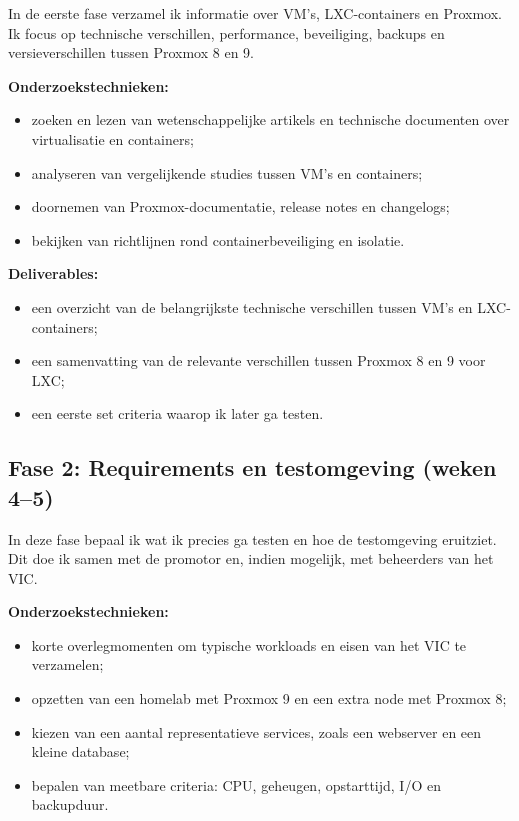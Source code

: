 In de eerste fase verzamel ik informatie over VM's, LXC-containers en Proxmox. Ik focus op technische verschillen, performance, beveiliging, backups en versieverschillen tussen Proxmox 8 en 9.

\textbf{Onderzoekstechnieken:}
\begin{itemize}
    \item zoeken en lezen van wetenschappelijke artikels en technische documenten over virtualisatie en containers;
    \item analyseren van vergelijkende studies tussen VM's en containers;
    \item doornemen van Proxmox-documentatie, release notes en changelogs;
    \item bekijken van richtlijnen rond containerbeveiliging en isolatie.
\end{itemize}

\textbf{Deliverables:}
\begin{itemize}
    \item een overzicht van de belangrijkste technische verschillen tussen VM's en LXC-containers;
    \item een samenvatting van de relevante verschillen tussen Proxmox 8 en 9 voor LXC;
    \item een eerste set criteria waarop ik later ga testen.
\end{itemize}

\subsection{Fase 2: Requirements en testomgeving (weken 4–5)}

In deze fase bepaal ik wat ik precies ga testen en hoe de testomgeving eruitziet. Dit doe ik samen met de promotor en, indien mogelijk, met beheerders van het VIC.

\textbf{Onderzoekstechnieken:}
\begin{itemize}
    \item korte overlegmomenten om typische workloads en eisen van het VIC te verzamelen;
    \item opzetten van een homelab met Proxmox 9 en een extra node met Proxmox 8;
    \item kiezen van een aantal representatieve services, zoals een webserver en een kleine database;
    \item bepalen van meetbare criteria: CPU, geheugen, opstarttijd, I/O en backupduur.
\end{itemize}

